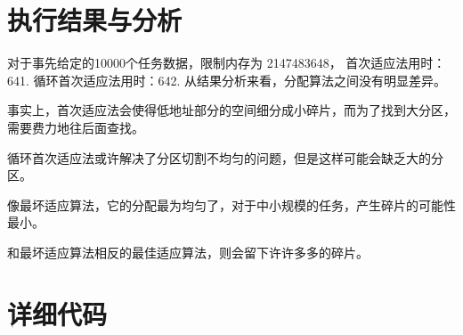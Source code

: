 \documentclass[UTF8]{ctexart}
\begin{document}
\section{执行结果与分析}
对于事先给定的10000个任务数据，限制内存为 2147483648，
首次适应法用时：641.
循环首次适应法用时：642.
从结果分析来看，分配算法之间没有明显差异。

事实上，首次适应法会使得低地址部分的空间细分成小碎片，而为了找到大分区，需要费力地往后面查找。

循环首次适应法或许解决了分区切割不均匀的问题，但是这样可能会缺乏大的分区。

像最坏适应算法，它的分配最为均匀了，对于中小规模的任务，产生碎片的可能性最小。

和最坏适应算法相反的最佳适应算法，则会留下许许多多的碎片。
\section{详细代码}
\end{document}
